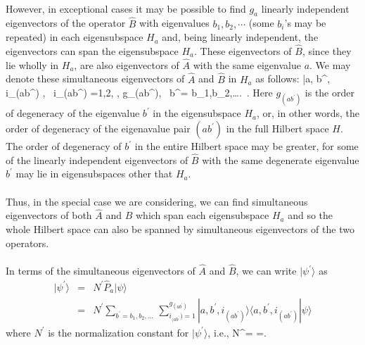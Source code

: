 \paragraph{}
However, in exceptional cases it may be possible to find $g_a$ linearly independent eigenvectors of the operator $\hat{B}$
with  eigenvalues $b_1, b_2, \cdots$ (some $b_i$'s may be repeated) in each eigensubspace $H_{a}$ and, being  linearly independent, the eigenvectors can span the eigensubspace $H_a$. These eigenvectors of $\hat{B}$, since they lie wholly in $H_{a}$, are also eigenvectors of $\hat{A}$ with the same eigenvalue $a$. We may denote these simultaneous eigenvectors
of $\hat{A}$ and $\hat{B}$ in $H_a$ as follows:
\be
|a, b^{\prime}, i_{(ab^{\prime})} \rangle, \, i_{(ab^{\prime})} =1,2, \cdots , g_{(ab^{\prime})}, \, b^{\prime}= b_1,b_2,\ldots. \,. 
\label{eq:simab}
\ee
Here $g_{(ab^{\prime})}$ is the order of degeneracy of the eigenvalue $b^{\prime}$ in the eigensubspace $H_a$, or, in other words, the order of degeneracy of the eigenavalue pair $(ab^{\prime})$ in the full Hilbert space $H$. The order of degeneracy of $b^{\prime}$ in the entire Hilbert space may be greater, for some of the linearly independent eigenvectors of $\hat{B}$  with the same degenerate eigenvalue  
$b^{\prime}$ may lie in eigensubspaces other that $H_a$. 

\paragraph{}
Thus, in the special case we are considering, we can find simultaneous eigenvectors of both $\hat{A}$ and $\hat{B}$ which span each eigensubspace $H_a$ and so the whole Hilbert space can also be spanned by simultaneous eigenvectors of the two operators. 

\paragraph{}
In terms of the simultaneous eigenvectors of $\hat{A}$ and $\hat{B}$, we can write $|\psi^{\prime}\rangle$ as
\begin{eqnarray}
|\psi^{\prime}\rangle &=& N^{\prime} \hat{P}_a |\psi\rangle \nonumber \\
&=&  N^{\prime} \sum_{b^{\prime}=b_1, b_2, \ldots}\,\sum_{i_{(ab^{\prime}})=1}^{g_{ (ab^{\prime})    }} |a,b^{\prime},i_{(ab^{\prime})}\rangle
\langle a,b^{\prime},i_{(ab^{\prime})}|\psi\rangle
\end{eqnarray}
where $N^{\prime}$ is the normalization constant for $|\psi^{\prime}\rangle$, i.e.,
\be
N^{\prime}= 
=.
\ee

